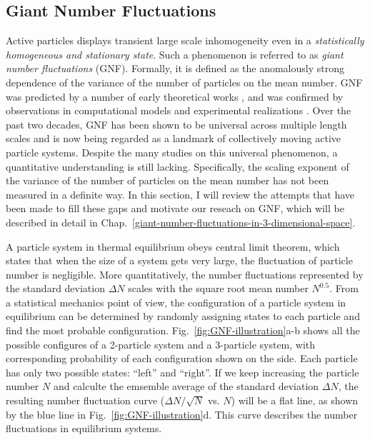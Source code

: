 \subsection{Giant Number Fluctuations}
Active particles displays transient large scale inhomogeneity even in a \textit{statistically homogeneous and stationary state}.
Such a phenomenon is referred to as \textit{giant number fluctuations} (GNF). Formally, it is defined as the anomalously strong dependence of the variance of the number of particles on the mean number.
GNF was predicted by a number of early theoretical works \cite{Toner1995, Toner1998,
Tu1998, Simha2002, Ramaswamy2003, Saintillan2008a, Saintillan2008b, Ramaswamy2010}, and was confirmed by observations in computational models
\cite{Mishra2006, Chate2008, Dey2012, Saintillan2012, Ngo2014, Mahault2019} and experimental realizations
\cite{Narayan2007, Aranson2008, Zhang2010, Deseigne2010, Schaller2013, Palacci2013,
Kawaguchi2017, Nishiguchi2017, Karani2019}. Over the past two decades, GNF has been shown to be universal across multiple length scales and is now being regarded as a landmark of collectively moving active particle systems. Despite the many studies on this universal phenomenon, a quantitative understanding is still lacking. Specifically, the scaling exponent of the variance of the number of particles on the mean number has not been measured in a definite way. In this section, I will review the attempts that have been made to fill these gaps and motivate our reseach on GNF, which will be described in detail in Chap.~\ref{giant-number-fluctuations-in-3-dimensional-space}.

A particle system in thermal equilibrium obeys central limit theorem, which states that when the size of a system gets very large, the fluctuation of particle number is negligible. More quantitatively, the number fluctuations represented by the standard deviation $\Delta N$ scales with the square root mean number $N^{0.5}$. From a statistical mechanics point of view, the configuration of a particle system in equilibrium can be determined by randomly assigning states to each particle and find the most probable configuration. Fig.~\ref{fig:GNF-illustration}a-b shows all the possible configures of a 2-particle system and a 3-particle system, with corresponding probability of each configuration shown on the side. Each particle has only two possible states: ``left'' and ``right''. If we keep increasing the particle number $N$ and calculte the emsemble average of the standard deviation $\Delta N$, the resulting number fluctuation curve ($\Delta N/\sqrt N$ vs. $N$) will be a flat line, as shown by the blue line in Fig.~\ref{fig:GNF-illustration}d. This curve describes the number fluctuations in equilibrium systems.

